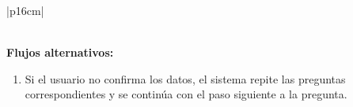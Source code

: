 \begin{longtable}{|p{16cm}|}
\begin{minipage}[t]{\linewidth}
\begin{enumerate}
            \end{enumerate}
            \vspace{1mm}
        \end{minipage} \\ \hline
        \textbf{Flujos alternativos:} \\
        \begin{minipage}[t]{\linewidth}
            \begin{enumerate}
                \item[15.a] Si el usuario no confirma los datos, el sistema repite las preguntas correspondientes y se continúa con el paso siguiente a la pregunta.
            \end{enumerate}
            \vspace{1mm}
        \end{minipage} \\ \hline
        \caption{Descripción general del caso de uso - Solicitud de la tarjeta sanitaria de SACYL por pérdida o robo.}
        \end{longtable}


